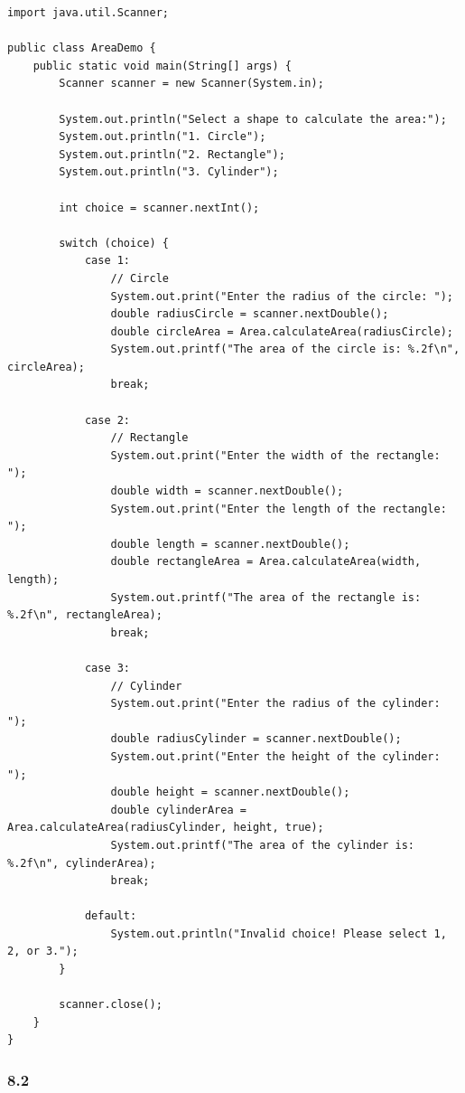 \documentclass{article}
\begin{document}
\begin{lstlisting}[caption=AreaDemo.java]
import java.util.Scanner;

public class AreaDemo {
    public static void main(String[] args) {
        Scanner scanner = new Scanner(System.in);

        System.out.println("Select a shape to calculate the area:");
        System.out.println("1. Circle");
        System.out.println("2. Rectangle");
        System.out.println("3. Cylinder");

        int choice = scanner.nextInt();

        switch (choice) {
            case 1:
                // Circle
                System.out.print("Enter the radius of the circle: ");
                double radiusCircle = scanner.nextDouble();
                double circleArea = Area.calculateArea(radiusCircle);
                System.out.printf("The area of the circle is: %.2f\n", circleArea);
                break;

            case 2:
                // Rectangle
                System.out.print("Enter the width of the rectangle: ");
                double width = scanner.nextDouble();
                System.out.print("Enter the length of the rectangle: ");
                double length = scanner.nextDouble();
                double rectangleArea = Area.calculateArea(width, length);
                System.out.printf("The area of the rectangle is: %.2f\n", rectangleArea);
                break;

            case 3:
                // Cylinder
                System.out.print("Enter the radius of the cylinder: ");
                double radiusCylinder = scanner.nextDouble();
                System.out.print("Enter the height of the cylinder: ");
                double height = scanner.nextDouble();
                double cylinderArea = Area.calculateArea(radiusCylinder, height, true);
                System.out.printf("The area of the cylinder is: %.2f\n", cylinderArea);
                break;

            default:
                System.out.println("Invalid choice! Please select 1, 2, or 3.");
        }

        scanner.close();
    }
}
\end{lstlisting}

\subsubsection*{8.2}
\end{document}
